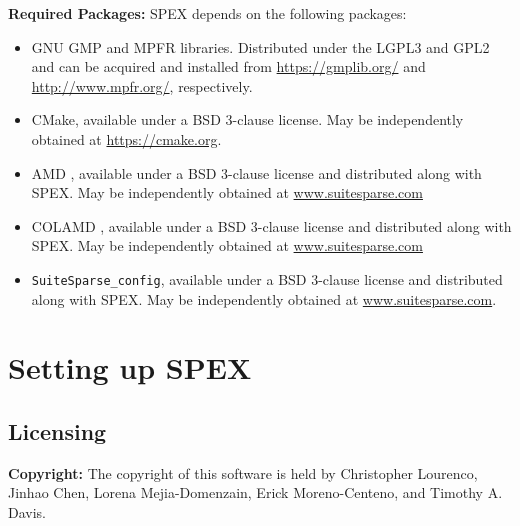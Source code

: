 \documentclass[12pt,oneside]{book}
\theoremstyle{definition}
\begin{document}
\noindent \textbf{Required Packages:} SPEX depends on the following packages:
\begin{itemize} 
    \item GNU GMP \cite{granlund2015gnu} and MPFR \cite{fousse2007mpfr} libraries. Distributed under the LGPL3 and GPL2 and can be acquired and installed from \url{https://gmplib.org/} and \url{http://www.mpfr.org/}, respectively.

    \item CMake, available under a BSD 3-clause license. May be independently obtained at \url{https://cmake.org}.
    
    \item AMD \cite{amestoy1996approximate,amestoy2004algorithmamd}, available under a BSD 3-clause license and distributed along with SPEX. May be independently obtained at \url{www.suitesparse.com}
    
    \item COLAMD \cite{davis2004column,davis2004algorithmcolamd}, available under a BSD 3-clause license and distributed along with SPEX. May be independently obtained at \url{www.suitesparse.com}
    
    \item \verb|SuiteSparse_config|, available under a BSD 3-clause
        license and distributed along with SPEX.
        May be independently obtained at \url{www.suitesparse.com}.

\end{itemize}



\chapter{Setting up SPEX}\vspace{-0.75in}

\section{Licensing} \label{s:util:licensing}
\textbf{Copyright:} The copyright of this software is held by Christopher Lourenco, Jinhao Chen, Lorena Mejia-Domenzain, Erick Moreno-Centeno, and Timothy A. Davis.\\
\end{document}
